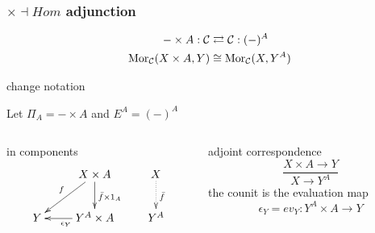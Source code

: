 \begin{frame}[t]
\frametitle{$\times \dashv Hom$ adjunction}
\begin{block}{}
\abovedisplayskip=0pt
\begin{align*}
- \times A: \mathcal{C} & \rightleftarrows \mathcal{C}: (-)^A\\
\mathop{\rm Mor}\nolimits_{\mathcal{C}}(X \times A, Y) & \cong  \mathop{\rm Mor}\nolimits_{\mathcal{C}}(X, Y^A)
\end{align*}
\end{block}
\begin{block}{change notation}
	\begin{center}
	Let $\Pi_A = - \times A$ and $E^A = (-)^A$
	\end{center}
\end{block}
\begin{columns}[t]
    \begin{column}{0.5\textwidth}
\begin{block}{in components}
			$$
			\xymatrix{
			& X \times A \ar[d]^{\bar{f} \times 1_A} \ar[dl]_{f} & X \ar@{.>}[d]^{\bar{f}}\\
			Y & Y^A \times A \ar[l]^{\epsilon_Y} & Y^A}
			$$
		\end{block}
    \end{column}
    \begin{column}{0.5\textwidth}
		\begin{block}{adjoint correspondence}
		\abovedisplayskip=0pt
		$$
			\frac{X \times A \longrightarrow Y}{X \longrightarrow Y^A}
		$$
		the counit is the evaluation map
		$$
			\epsilon_Y = ev_Y \colon Y^A \times A \longrightarrow Y
		$$
		\end{block}		
    \end{column}
\end{columns}
\end{frame}
